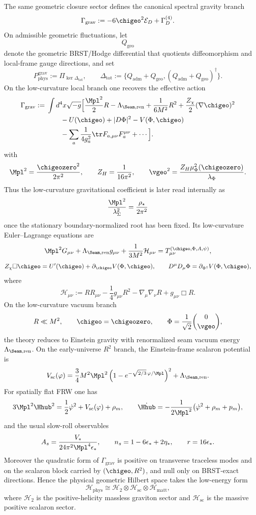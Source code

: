 \begin{theorem}
\label{thm:gravity-cosmology-closure}
The same geometric closure sector defines the canonical spectral gravity branch
\[
\Gamma_{\mathrm{grav}}
:=
-6\chigeo^2\mathcal E_D+\Gamma_D^{(4)}.
\]
On admissible geometric fluctuations, let
\[
Q_{\mathrm{geo}}
\]
denote the geometric BRST/Hodge differential that quotients diffeomorphism and local-frame gauge
directions, and set
\[
P_{\mathrm{phys}}^{\mathrm{grav}}
:=
\Pi_{\ker\Delta_{\mathrm{tot}}},
\qquad
\Delta_{\mathrm{tot}}
:=
\{Q_{\mathrm{adm}}+Q_{\mathrm{geo}},(Q_{\mathrm{adm}}+Q_{\mathrm{geo}})^\dagger\}.
\]
On the low-curvature local branch one recovers the effective action
\[
\begin{aligned}
\Gamma_{\mathrm{grav}}
:={}&
\int d^4x\sqrt{-g}\Big[
\frac{\Mpl^2}{2}R
-\Lambda_{\Seam,\mathrm{ren}}
+\frac{1}{6M^2}R^2
+\frac{Z_\chi}{2}(\nabla\chigeo)^2
\\
&\qquad
-U(\chigeo)
+|D\Phi|^2
-V(\Phi,\chigeo)
\\
&\qquad
-\sum_a \frac{1}{4g_a^2}\tr F_{a,\mu\nu}F_a^{\mu\nu}
+\cdots
\Big].
\end{aligned}
\]
with
\[
\Mpl^2=\frac{\chigeozero^2}{2\pi^2},
\qquad
Z_H=\frac{1}{16\pi^2},
\qquad
\vgeo^2=\frac{Z_H\mu_\Phi^2(\chigeozero)}{\lambda_\Phi}.
\]
Thus the low-curvature gravitational coefficient is later read internally as
\[
\frac{\Mpl^2}{\lambda_\Sigma^2}=\frac{\rho_\star}{2\pi^2}
\]
once the stationary boundary-normalized root has been fixed.
Its low-curvature Euler--Lagrange equations are
\[
\Mpl^2 G_{\mu\nu}
+\Lambda_{\Seam,\mathrm{ren}} g_{\mu\nu}
+\frac{1}{3M^2}\mathcal H_{\mu\nu}
=
T_{\mu\nu}^{(\chigeo,\Phi,A,\psi)},
\]
\[
Z_\chi\Box\chigeo=U'(\chigeo)+\partial_{\chigeo}V(\Phi,\chigeo),
\qquad
D^\mu D_\mu\Phi=\partial_{\Phi^\dagger}V(\Phi,\chigeo),
\]
where
\[
\mathcal H_{\mu\nu}
:=
RR_{\mu\nu}
-\frac14 g_{\mu\nu}R^2
-\nabla_\mu\nabla_\nu R
+g_{\mu\nu}\Box R.
\]
On the low-curvature vacuum branch
\[
R\ll M^2,
\qquad
\chigeo=\chigeozero,
\qquad
\Phi=\frac{1}{\sqrt2}\binom{0}{\vgeo},
\]
the theory reduces to Einstein gravity with renormalized seam vacuum energy $\Lambda_{\Seam,\mathrm{ren}}$.
On the early-universe $R^2$ branch, the Einstein-frame scalaron potential is
\[
V_{\mathrm{sc}}(\varphi)
=
\frac34 M^2\Mpl^2
\left(1-e^{-\sqrt{2/3}\,\varphi/\Mpl}\right)^2
+\Lambda_{\Seam,\mathrm{ren}}.
\]
For spatially flat FRW one has
\[
3\Mpl^2\Hhub^2
=
\frac12\dot\varphi^2+V_{\mathrm{sc}}(\varphi)+\rho_m,
\qquad
\dot{\Hhub}
=
-\frac{1}{2\Mpl^2}\bigl(\dot\varphi^2+\rho_m+p_m\bigr),
\]
and the usual slow-roll observables
\[
A_s=\frac{V_*}{24\pi^2\Mpl^4\epsilon_*},
\qquad
n_s=1-6\epsilon_*+2\eta_*,
\qquad
r=16\epsilon_*.
\]
Moreover the quadratic form of $\Gamma_{\mathrm{grav}}$ is positive on transverse traceless modes
and on the scalaron block carried by $(\chigeo,R^2)$, and null only on BRST-exact directions.
Hence the physical geometric Hilbert space takes the low-energy form
\[
\mathcal H_{\mathrm{phys}}
\cong
\mathcal H_{2}\otimes\mathcal H_{\mathrm{sc}}\otimes\mathcal H_{\mathrm{matt}},
\]
where $\mathcal H_{2}$ is the positive-helicity massless graviton sector and
$\mathcal H_{\mathrm{sc}}$ is the massive positive scalaron sector.
\end{theorem}

